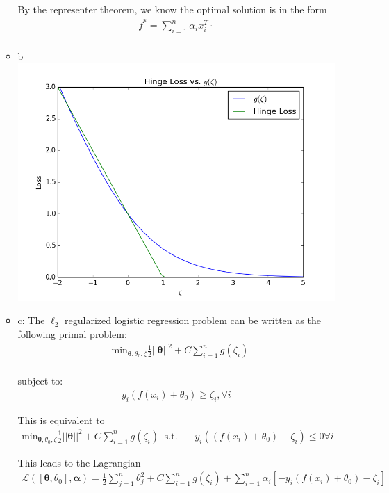 \documentclass[11pt]{article}
\newcommand{\T}{\bm{\theta}}
\newcommand{\A}{\bm{\alpha}}
\begin{document}
\begin{enumerate}
\begin{itemize}
By the representer theorem, we know the optimal solution is in the form 
\begin{align*}
f^* = \sum_{i=1}^n \alpha_i x_i^T\cdot \\
\end{align*}
\item b \includegraphics[scale=.75]{hinge_loss.png}
\item c: The $\ell_2$ regularized logistic regression problem can be written as the following primal problem:
\begin{align*}
& \text{min}_{\T,\theta_0,\zeta} \frac{1}{2}||\T||^2 + C \sum_{i=1}^ng(\zeta_i)\\
\end{align*}

subject to:
\begin{align*}
y_i(f(x_i) + \theta_0) \geq \zeta_i, \forall i
\end{align*}

This is equivalent to 
\begin{align*}\text{min}_{\T,\theta_0,\zeta} \frac{1}{2}||\T||^2 + C \sum_{i=1}^ng(\zeta_i) \; \; \text{s.t.} \; \; -y_i((f(x_i)+\theta_0) - \zeta_i) \leq 0 \forall i
\end{align*}

This leads to the Lagrangian
\begin{align*}
\mathcal{L}([\T,\theta_0],\A) = \frac{1}{2}\sum_{j=1}^n\theta_j^2 + C\sum_{i=1}^ng(\zeta_i) + \sum_{i=1}^n\alpha_i\left[-y_i(f(x_i)+\theta_0) - \zeta_i\right]
\end{align*}


\end{itemize}
\end{enumerate}
\end{document}

